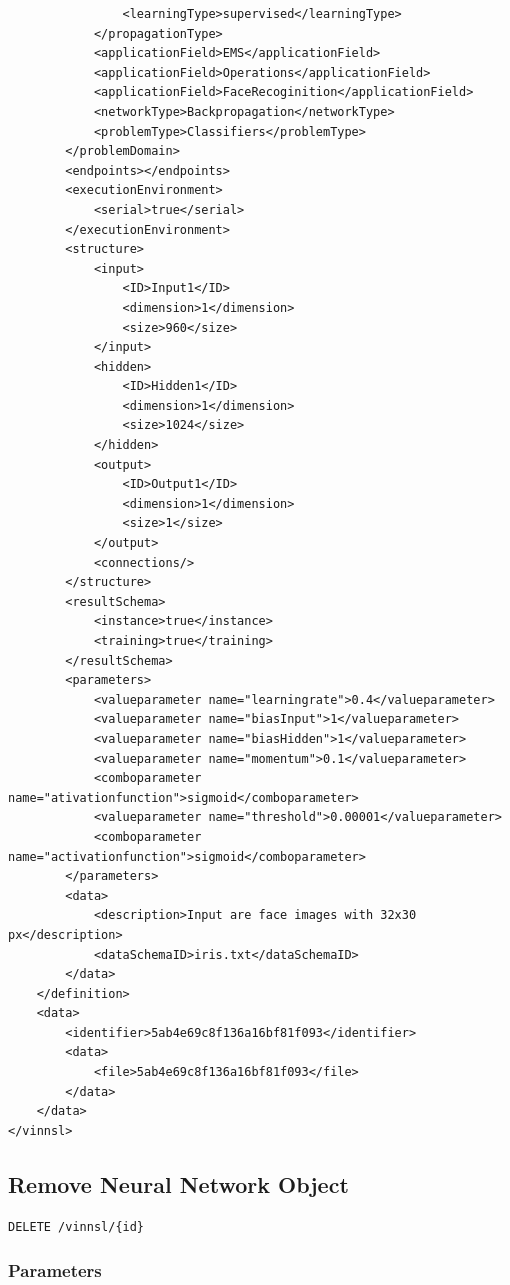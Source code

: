 \begin{verbatim}
                <learningType>supervised</learningType>
            </propagationType>
            <applicationField>EMS</applicationField>
            <applicationField>Operations</applicationField>
            <applicationField>FaceRecoginition</applicationField>
            <networkType>Backpropagation</networkType>
            <problemType>Classifiers</problemType>
        </problemDomain>
        <endpoints></endpoints>
        <executionEnvironment>
            <serial>true</serial>
        </executionEnvironment>
        <structure>
            <input>
                <ID>Input1</ID>
                <dimension>1</dimension>
                <size>960</size>
            </input>
            <hidden>
                <ID>Hidden1</ID>
                <dimension>1</dimension>
                <size>1024</size>
            </hidden>
            <output>
                <ID>Output1</ID>
                <dimension>1</dimension>
                <size>1</size>
            </output>
            <connections/>
        </structure>
        <resultSchema>
            <instance>true</instance>
            <training>true</training>
        </resultSchema>
        <parameters>
            <valueparameter name="learningrate">0.4</valueparameter>
            <valueparameter name="biasInput">1</valueparameter>
            <valueparameter name="biasHidden">1</valueparameter>
            <valueparameter name="momentum">0.1</valueparameter>
            <comboparameter name="ativationfunction">sigmoid</comboparameter>
            <valueparameter name="threshold">0.00001</valueparameter>
            <comboparameter name="activationfunction">sigmoid</comboparameter>
        </parameters>
        <data>
            <description>Input are face images with 32x30 px</description>
            <dataSchemaID>iris.txt</dataSchemaID>
        </data>
    </definition>
    <data>
        <identifier>5ab4e69c8f136a16bf81f093</identifier>
        <data>
            <file>5ab4e69c8f136a16bf81f093</file>
        </data>
    </data>
</vinnsl>
\end{verbatim}

\subsection{Remove Neural Network
Object}\label{remove-neural-network-object}

\begin{verbatim}
DELETE /vinnsl/{id}
\end{verbatim}

\subsubsection{Parameters}\label{parameters-2}

